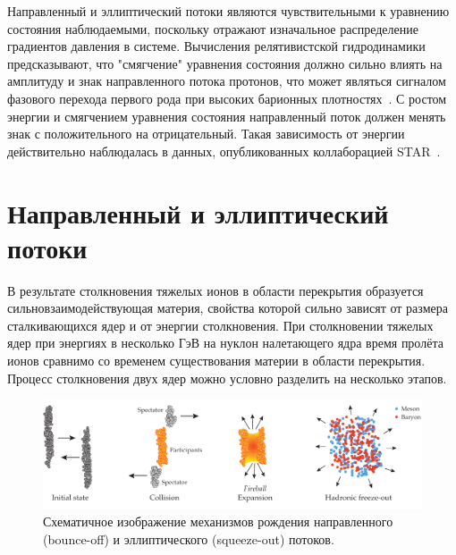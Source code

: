 Направленный и эллиптический потоки являются чувствительными к уравнению состояния наблюдаемыми, поскольку отражают изначальное распределение градиентов давления в системе.
Вычисления релятивистской гидродинамики предсказывают, что "смягчение" уравнения состояния должно сильно влиять на амплитуду и знак направленного потока протонов, что может являться сигналом фазового перехода первого рода при высоких барионных плотностях~\cite{Rischke:1995pe, Stoecker:2004qu}.
С ростом энергии и смягчением уравнения состояния направленный поток должен менять знак с положительного на отрицательный.
Такая зависимость от энергии действительно наблюдалась в данных, опубликованных коллаборацией STAR~\cite{STAR:2014clz}.

\section{Направленный и эллиптический потоки}

В результате столкновения тяжелых ионов в области перекрытия образуется сильновзаимодействующая материя, свойства которой сильно зависят от размера сталкивающихся ядер и от энергии столкновения.
При столкновении тяжелых ядер при энергиях в несколько ГэВ на нуклон налетающего ядра время пролёта ионов сравнимо со временем существования материи в области перекрытия.
Процесс столкновения двух ядер можно условно разделить на несколько этапов.

%
\begin{figure}[ht]
\begin{center}
    \includegraphics[width=0.75\linewidth]{images/berush1.png}
    \caption{Схематичное изображение механизмов рождения направленного (bounce-off) и эллиптического (squeeze-out) потоков.}
    \label{fig:berush1}
\end{center}
\end{figure}
%


